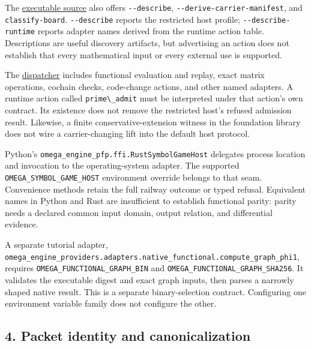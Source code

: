 \documentclass[
  11pt,
]{article}
\newcommand{\passthrough}[1]{#1}
\begin{document}
The
\href{https://github.com/dbccpage/the_symbol_game/blob/52cb5457f6c485ba548cfd292f6012a941ed22cf/omega_engine/crates_rs/omega_symbol_game/src/main.rs}{executable
source} also offers \passthrough{\lstinline!--describe!},
\nolinkurl{--derive-carrier-manifest}, and \nolinkurl{classify-board}.
\passthrough{\lstinline!--describe!} reports the restricted host
profile; \nolinkurl{--describe-runtime} reports adapter names derived
from the runtime action table. Descriptions are useful discovery
artifacts, but advertising an action does not establish that every
mathematical input or every external use is supported.

The
\href{https://github.com/dbccpage/the_symbol_game/blob/52cb5457f6c485ba548cfd292f6012a941ed22cf/omega_engine/crates_rs/omega_symbol_game/src/invoke.rs}{dispatcher}
includes functional evaluation and replay, exact matrix operations,
cochain checks, code-change actions, and other named adapters. A runtime
action called \passthrough{\lstinline!prime\_admit!} must be interpreted
under that action's own contract. Its existence does not remove the
restricted host's refused admission result. Likewise, a finite
conservative-extension witness in the foundation library does not wire a
carrier-changing lift into the default host protocol.

Python's \nolinkurl{omega_engine_pfp.ffi.RustSymbolGameHost} delegates
process location and invocation to the operating-system adapter. The
supported \nolinkurl{OMEGA_SYMBOL_GAME_HOST} environment override
belongs to that seam. Convenience methods retain the full railway
outcome or typed refusal. Equivalent names in Python and Rust are
insufficient to establish functional parity: parity needs a declared
common input domain, output relation, and differential evidence.

A separate tutorial adapter,
\nolinkurl{omega_engine_providers.adapters.native_functional.compute_graph_phi1},
requires \nolinkurl{OMEGA_FUNCTIONAL_GRAPH_BIN} and
\nolinkurl{OMEGA_FUNCTIONAL_GRAPH_SHA256}. It validates the executable
digest and exact graph inputs, then parses a narrowly shaped native
result. This is a separate binary-selection contract. Configuring one
environment variable family does not configure the other.

\subsection{4. Packet identity and
canonicalization}\label{packet-identity-and-canonicalization}
\end{document}
